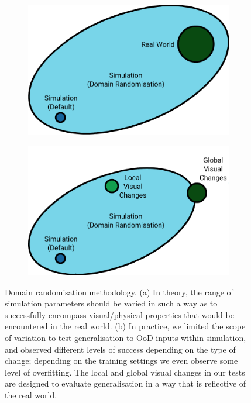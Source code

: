 \begin{figure}
  \centering
  \begin{subfigure}{0.45\textwidth}
    \includegraphics[width=\linewidth]{figures/chapter6/dr_concept}
  \end{subfigure}
  \hspace{0.05\textwidth}
  \begin{subfigure}{0.45\textwidth}
    \includegraphics[width=\linewidth]{figures/chapter6/dr_concept_results}
  \end{subfigure}
  \caption[Domain randomisation methodology.]{Domain randomisation methodology. (a) In theory, the range of simulation parameters should be varied in such a way as to successfully encompass visual/physical properties that would be encountered in the real world. (b) In practice, we limited the scope of variation to test generalisation to OoD inputs within simulation, and observed different levels of success depending on the type of change; depending on the training settings we even observe some level of overfitting. The local and global visual changes in our tests are designed to evaluate generalisation in a way that is reflective of the real world.}
  \label{fig:dr_concept}
\end{figure}

